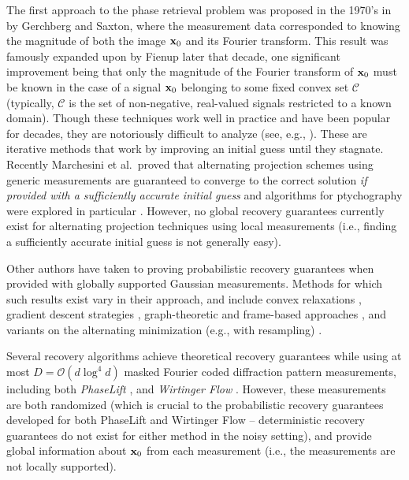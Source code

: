 The first approach to the phase retrieval problem was proposed in the 1970's in \cite{gerchberg1972practical} by Gerchberg and Saxton, where the measurement data corresponded to knowing the magnitude of both the image $\mathbf x_0$ and its Fourier transform.  This result was famously expanded upon by Fienup \cite{fienup1978reconstruction} later that decade, one significant improvement being that only the magnitude of the Fourier transform of $\mathbf x_0$ must be known in the case of a signal $\mathbf x_0$ belonging to some fixed convex set $\mathcal{C}$ (typically, $\mathcal{C}$ is the set of non-negative, real-valued signals restricted to a known domain).  Though these techniques work well in practice and have been popular for decades, they are notoriously difficult to analyze (see, e.g., \cite{takajo1997numerical,takajo1998study,takajo1999further,bauschke2002phase,bauschke2003hybrid,elser2003phase}).  These are  iterative methods that work by improving an initial guess until they stagnate.  Recently Marchesini et al.~proved that alternating projection schemes using generic measurements are guaranteed to converge to the correct solution {\em if provided with a sufficiently accurate initial guess} and algorithms for ptychography were explored in particular \cite{marchesini2015alternating}.  However, no global recovery guarantees currently exist for alternating projection techniques using local measurements (i.e., finding a sufficiently accurate initial guess is not generally easy).

Other authors have taken to proving probabilistic recovery guarantees when provided with globally supported Gaussian measurements.  Methods for which such results exist vary in their approach, and include convex relaxations \cite{candes2014solving,candes2012phaselift}, gradient descent strategies \cite{candes2015phase}, graph-theoretic  \cite{alexeev2014phase} and frame-based approaches \cite{balan2009painless, bodmann2013stable}, and variants on the alternating minimization (e.g., with resampling) \cite{netrapalli2013phase}.

Several recovery algorithms achieve theoretical recovery guarantees while using at most $D = \mathcal{O}(d \log^4 d)$ masked Fourier coded diffraction pattern measurements, including both {\em PhaseLift} \cite{Candes2014WF,gross2015improved}, and {\em Wirtinger Flow} \cite{candes2015phase}.  However, these measurements are both randomized (which is crucial to the probabilistic recovery guarantees developed for both PhaseLift and Wirtinger Flow -- deterministic recovery guarantees do not exist for either method in the noisy setting), and provide global information about $\mathbf x_0$ from each measurement (i.e., the measurements are not locally supported).

